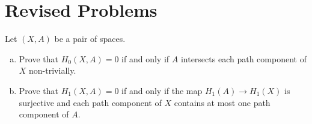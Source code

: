 \documentclass[10pt]{mypackage}
\begin{document}
\RaggedRight
\section{Revised Problems}%
\begin{problem}
  Let $\left( X,A \right)$ be a pair of spaces.
  \begin{enumerate}[(a)]
    \item Prove that $H_0\left( X,A \right) = 0$ if and only if $A$ intersects each path component of $X$ non-trivially.
    \item Prove that $H_1\left( X,A \right) = 0$ if and only if the map $H_1\left( A \right)\rightarrow H_1\left( X \right)$ is surjective and each path component of $X$ contains at most one path component of $A$.
  \end{enumerate}
\end{problem}
\end{document}
